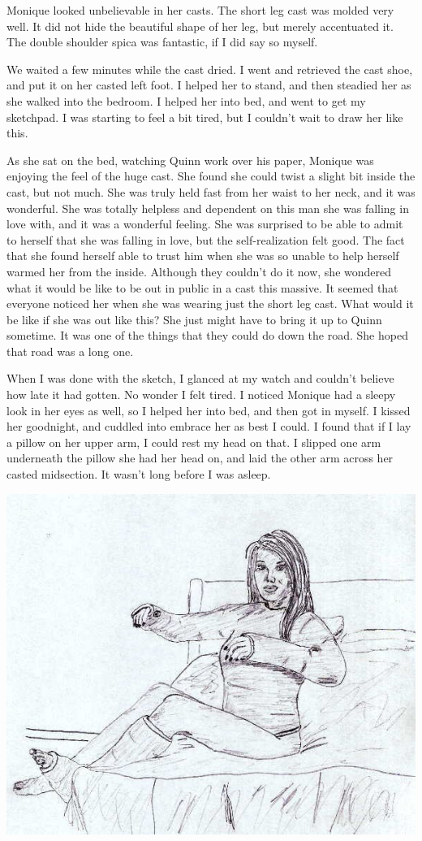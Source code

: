 Monique looked unbelievable in her casts. The short leg cast was molded very well. It did
not hide the beautiful shape of her leg, but merely accentuated it. The double shoulder spica
was fantastic, if I did say so myself.

We waited a few minutes while the cast dried. I went and retrieved the cast shoe, and put
it on her casted left foot. I helped her to stand, and then steadied her as she walked into the
bedroom. I helped her into bed, and went to get my sketchpad. I was starting to feel a bit
tired, but I couldn't wait to draw her like this.

\begin{thought}
As she sat on the bed, watching Quinn work over his paper, Monique was enjoying the feel of
the huge cast. She found she could twist a slight bit inside the cast, but not much. She was
truly held fast from her waist to her neck, and it was wonderful. She was totally helpless and
dependent on this man she was falling in love with, and it was a wonderful feeling. She was
surprised to be able to admit to herself that she was falling in love, but the self-realization
felt good. The fact that she found herself able to trust him when she was so unable to help
herself warmed her from the inside. Although they couldn't do it now, she wondered what it would
be like to be out in public in a cast this massive. It seemed that everyone noticed her when she
was wearing just the short leg cast. What would it be like if she was out like this? She just
might have to bring it up to Quinn sometime. It was one of the things that they could do down
the road. She hoped that road was a long one.
\end{thought}

When I was done with the sketch, I glanced at my watch and couldn't believe how late it had
gotten. No wonder I felt tired. I noticed Monique had a sleepy look in her eyes as well, so I
helped her into bed, and then got in myself. I kissed her goodnight, and cuddled into embrace
her as best I could. I found that if I lay a pillow on her upper arm, I could rest my head on
that. I slipped one arm underneath the pillow she had her head on, and laid the other arm across
her casted midsection. It wasn't long before I was asleep.

\begin{center}
\includegraphics{images/kicks30.jpg}
\end{center}
